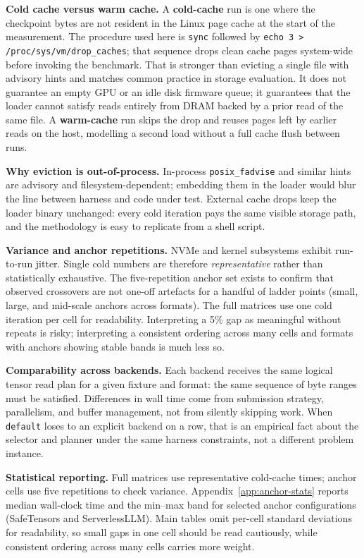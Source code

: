 \textbf{Cold cache versus warm cache.} A \textbf{cold-cache} run is one where the checkpoint bytes are not resident in the Linux page cache at the start of the measurement. The procedure used here is \texttt{sync} followed by \texttt{echo 3 > /proc/sys/vm/drop\_caches}; that sequence drops clean cache pages system-wide before invoking the benchmark. That is stronger than evicting a single file with advisory hints and matches common practice in storage evaluation. It does not guarantee an empty GPU or an idle disk firmware queue; it guarantees that the loader cannot satisfy reads entirely from DRAM backed by a prior read of the same file. A \textbf{warm-cache} run skips the drop and reuses pages left by earlier reads on the host, modelling a second load without a full cache flush between runs.

\textbf{Why eviction is out-of-process.} In-process \texttt{posix\_fadvise} and similar hints are advisory and filesystem-dependent; embedding them in the loader would blur the line between harness and code under test. External cache drops keep the loader binary unchanged: every cold iteration pays the same visible storage path, and the methodology is easy to replicate from a shell script.

\textbf{Variance and anchor repetitions.} NVMe and kernel subsystems exhibit run-to-run jitter. Single cold numbers are therefore \emph{representative} rather than statistically exhaustive. The five-repetition anchor set exists to confirm that observed crossovers are not one-off artefacts for a handful of ladder points (small, large, and mid-scale anchors across formats). The full matrices use one cold iteration per cell for readability. Interpreting a 5\% gap as meaningful without repeats is risky; interpreting a consistent ordering across many cells and formats with anchors showing stable bands is much less so.

\textbf{Comparability across backends.} Each backend receives the same logical tensor read plan for a given fixture and format: the same sequence of byte ranges must be satisfied. Differences in wall time come from submission strategy, parallelism, and buffer management, not from silently skipping work. When \texttt{default} loses to an explicit backend on a row, that is an empirical fact about the selector and planner under the same harness constraints, not a different problem instance.

\textbf{Statistical reporting.} Full matrices use representative cold-cache times; anchor cells use five repetitions to check variance. Appendix~\ref{app:anchor-stats} reports median wall-clock time and the min--max band for selected anchor configurations (SafeTensors and ServerlessLLM). Main tables omit per-cell standard deviations for readability, so small gaps in one cell should be read cautiously, while consistent ordering across many cells carries more weight.

